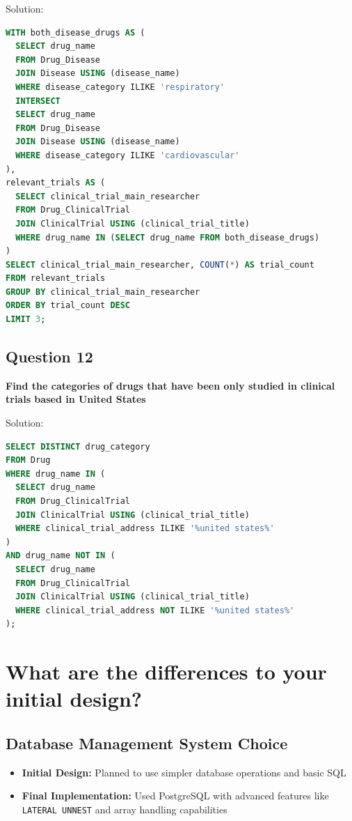 \documentclass[12pt,a4paper]{article}
\begin{document}
Solution:
\begin{lstlisting}[language=SQL]
WITH both_disease_drugs AS (
  SELECT drug_name
  FROM Drug_Disease
  JOIN Disease USING (disease_name)
  WHERE disease_category ILIKE 'respiratory'
  INTERSECT
  SELECT drug_name
  FROM Drug_Disease
  JOIN Disease USING (disease_name)
  WHERE disease_category ILIKE 'cardiovascular'
),
relevant_trials AS (
  SELECT clinical_trial_main_researcher
  FROM Drug_ClinicalTrial
  JOIN ClinicalTrial USING (clinical_trial_title)
  WHERE drug_name IN (SELECT drug_name FROM both_disease_drugs)
)
SELECT clinical_trial_main_researcher, COUNT(*) AS trial_count
FROM relevant_trials
GROUP BY clinical_trial_main_researcher
ORDER BY trial_count DESC
LIMIT 3;
\end{lstlisting}

\subsection{Question 12}
\textbf{Find the categories of drugs that have been only studied in clinical trials based in United States}

Solution:
\begin{lstlisting}[language=SQL]
SELECT DISTINCT drug_category
FROM Drug
WHERE drug_name IN (
  SELECT drug_name
  FROM Drug_ClinicalTrial
  JOIN ClinicalTrial USING (clinical_trial_title)
  WHERE clinical_trial_address ILIKE '%united states%'
)
AND drug_name NOT IN (
  SELECT drug_name
  FROM Drug_ClinicalTrial
  JOIN ClinicalTrial USING (clinical_trial_title)
  WHERE clinical_trial_address NOT ILIKE '%united states%'
);
\end{lstlisting}


\section{What are the differences to your initial design?}

\subsection{Database Management System Choice}
\begin{itemize}
    \item \textbf{Initial Design:} Planned to use simpler database operations and basic SQL
    \item \textbf{Final Implementation:} Used PostgreSQL with advanced features like \texttt{LATERAL UNNEST} and array handling capabilities
\end{itemize}
\end{document}
